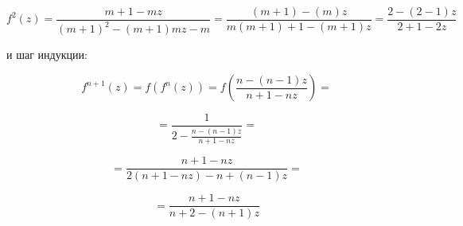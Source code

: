 \documentclass[a4paper,12pt]{article} %
\begin{document}
\begin{example}
\[ f^{2}(z)=\frac{m+1-m z}{(m+1)^{2}-(m+1) m z-m}=\frac{(m+1)-(m) z}{m(m+1)+1-(m+1) z}=\frac{2-(2-1) z}{2+1-2 z} \]



и шаг индукции:


$$
f^{n+1}(z)=f\left(f^{n}(z)\right)=f\left(\frac{n-(n-1) z}{n+1-n z}\right)=
$$



$$
=\frac{1}{2-\frac{n-(n-1) z}{n+1-n z}}=
$$


$$
=\frac{n+1-n z}{2(n+1-n z)-n+(n-1) z}=
$$



$$
=\frac{n+1-n z}{n+2-(n+1) z}
$$








\end{example}
\end{document}
